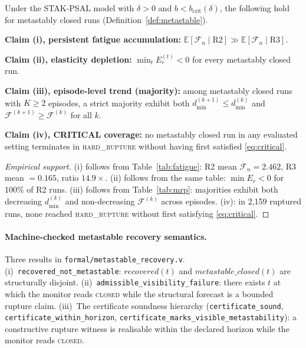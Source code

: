 \documentclass{llncs}
\newcommand{\st}[1]{\textup{\textsc{#1}}}
\begin{document}
\begin{principle}
\label{thm:mrp}
Under the STAK-PSAL model with $\delta > 0$ and $b <
b_{\mathrm{crit}}(\delta)$, the following hold for metastably closed
runs (Definition~\ref{def:metastable}).

\textbf{Claim (i), persistent fatigue accumulation:}
$\mathbb{E}[\mathcal{F}_n \mid \mathrm{R2}] \gg
\mathbb{E}[\mathcal{F}_n \mid \mathrm{R3}]$.

\textbf{Claim (ii), elasticity depletion:}
$\min_t E_r^{(t)} < 0$ for every metastably closed run.

\textbf{Claim (iii), episode-level trend (majority):} among metastably
closed runs with $K \geq 2$ episodes, a strict majority exhibit both
$d_{\min}^{(k+1)} \leq d_{\min}^{(k)}$ and $\mathcal{F}^{(k+1)} \geq
\mathcal{F}^{(k)}$ for all $k$.

\textbf{Claim (iv), CRITICAL coverage:} no metastably closed run in any
evaluated setting terminates in \st{hard\_rupture} without having first
satisfied \eqref{eq:critical}.
\end{principle}

\begin{proof}[Empirical support]
(i) follows from Table~\ref{tab:fatigue}: R2 mean $\mathcal{F}_n = 2.462$,
R3 mean $= 0.165$, ratio $14.9\times$. (ii) follows from the same table:
$\min E_r < 0$ for 100\% of R2 runs. (iii) follows from Table~\ref{tab:mrp}:
majorities exhibit both decreasing $d_{\min}^{(k)}$ and non-decreasing
$\mathcal{F}^{(k)}$ across episodes. (iv): in 2,159 ruptured runs, none
reached \st{hard\_rupture} without first satisfying \eqref{eq:critical}.
\end{proof}

{\sloppy\paragraph{Machine-checked metastable recovery semantics.}
Three results in \texttt{formal/\allowbreak{}metastable\_recovery.v}.
(i)~\texttt{recovered\_not\_\allowbreak{}metastable}: $\mathit{recovered}(t)$
and $\mathit{metastable\_closed}(t)$ are structurally disjoint.
(ii)~\texttt{admissible\_\allowbreak{}visibility\_failure}: there exists
$t$ at which the monitor reads \st{closed} while the structural forecast
is a bounded rupture claim.
(iii)~The certificate soundness hierarchy
(\texttt{certificate\_sound},
\texttt{certificate\_\allowbreak{}within\_horizon},
\texttt{certificate\_\allowbreak{}marks\_visible\_\allowbreak{}metastability}):
a constructive rupture witness is realisable within the declared horizon
while the monitor reads \st{closed}.\par}
\end{document}
